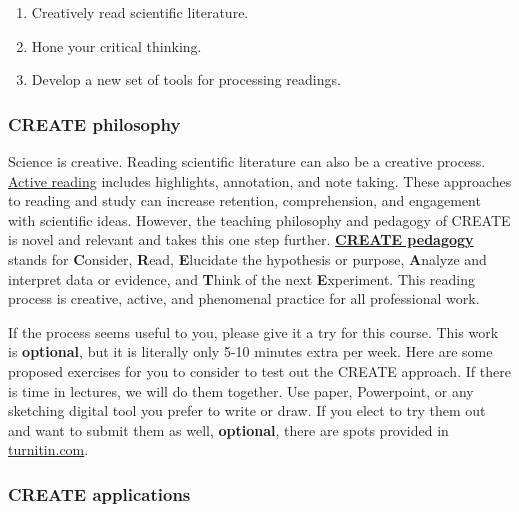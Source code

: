 \documentclass[
]{book}
\providecommand{\tightlist}{%
  \setlength{\itemsep}{0pt}\setlength{\parskip}{0pt}}
\begin{document}
\begin{enumerate}
\def\labelenumi{\arabic{enumi}.}
\tightlist
\item
  Creatively read scientific literature.\\
\item
  Hone your critical thinking.\\
\item
  Develop a new set of tools for processing readings.
\end{enumerate}

\hypertarget{create-philosophy}{%
\subsubsection*{CREATE philosophy}\label{create-philosophy}}

Science is creative. Reading scientific literature can also be a creative process. \href{https://help.open.ac.uk/active-reading}{Active reading} includes highlights, annotation, and note taking. These approaches to reading and study can increase retention, comprehension, and engagement with scientific ideas. However, the teaching philosophy and pedagogy of CREATE is novel and relevant and takes this one step further. \href{https://academic.oup.com/genetics/article/176/3/1381/6062159}{\textbf{CREATE pedagogy}} stands for \textbf{C}onsider, \textbf{R}ead, \textbf{E}lucidate the hypothesis or purpose, \textbf{A}nalyze and interpret data or evidence, and \textbf{T}hink of the next \textbf{E}xperiment. This reading process is creative, active, and phenomenal practice for all professional work.

If the process seems useful to you, please give it a try for this course. This work is \textbf{optional}, but it is literally only 5-10 minutes extra per week. Here are some proposed exercises for you to consider to test out the CREATE approach. If there is time in lectures, we will do them together. Use paper, Powerpoint, or any sketching digital tool you prefer to write or draw. If you elect to try them out and want to submit them as well, \textbf{optional}, there are spots provided in \href{https://turnitin.com}{turnitin.com}.

\hypertarget{create-applications}{%
\subsubsection*{CREATE applications}\label{create-applications}}
\end{document}
